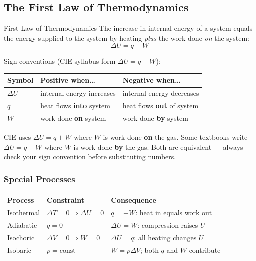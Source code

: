 \subsection{The First Law of Thermodynamics}

\begin{defnbox}{First Law of Thermodynamics}
The increase in internal energy of a system equals the energy supplied to the system
by heating \textit{plus} the work done \textit{on} the system:
\begin{equation}
  \Delta U = q + W
\end{equation}
\end{defnbox}

Sign conventions (CIE syllabus form $\Delta U = q + W$):

\medskip
\begin{center}
\renewcommand{\arraystretch}{1.3}
\begin{tabular}{lll}
\toprule
\textbf{Symbol} & \textbf{Positive when\ldots} & \textbf{Negative when\ldots} \\
\midrule
$\Delta U$ & internal energy increases & internal energy decreases \\
$q$        & heat flows \textbf{into} system & heat flows \textbf{out} of system \\
$W$        & work done \textbf{on} system & work done \textbf{by} system \\
\bottomrule
\end{tabular}
\end{center}

\begin{tipbox}
CIE uses $\Delta U = q + W$ where $W$ is work done \textbf{on} the gas.
Some textbooks write $\Delta U = q - W$ where $W$ is work done \textbf{by} the gas.
Both are equivalent — always check your sign convention before substituting numbers.
\end{tipbox}

\subsubsection{Special Processes}

\begin{center}
\renewcommand{\arraystretch}{1.4}
\begin{tabular}{p{2.8cm}p{3.8cm}p{5.5cm}}
\toprule
\textbf{Process} & \textbf{Constraint} & \textbf{Consequence} \\
\midrule
Isothermal   & $\Delta T = 0 \Rightarrow \Delta U = 0$ & $q = -W$: heat in equals work out \\
Adiabatic    & $q = 0$                                 & $\Delta U = W$: compression raises $U$ \\
Isochoric    & $\Delta V = 0 \Rightarrow W = 0$        & $\Delta U = q$: all heating changes $U$ \\
Isobaric     & $p = \mathrm{const}$                    & $W = p\Delta V$; both $q$ and $W$ contribute \\
\bottomrule
\end{tabular}
\end{center}

